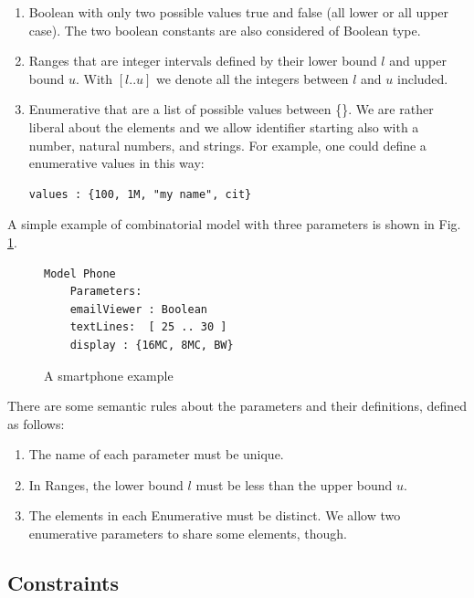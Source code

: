 \begin{tikzborder}{\cite{Gargantini16:validation}}
\begin{tikzborder}{\cite{gargantini_combinatorial_2017}}
\begin{tikzborder}{\cite{garn2019}}
\begin{tikzborder}{\cite{arcaini2019achieving}}
\begin{tikzborder}{\cite{IWCTGargantini2018}}
\begin{enumerate}
	\item \textsf{Boolean} with only two possible values \textsf{true} and \textsf{false} (all lower or all upper case).
	The two boolean constants are also considered of Boolean type.
	\item \textsf{Ranges} that are integer intervals defined by their lower bound $l$ and upper bound $u$. With $[l..u]$ we denote all the integers between $l$ and $u$ included.
	\item \textsf{Enumerative} that are a list of possible values between \{\}. We are rather liberal about the elements and we allow identifier starting also with a number, natural numbers, and strings. For example, one could define a  enumerative \textsf{values} in this way:
	\begin{lstlisting}[language=ctwedge]
	values : {100, 1M, "my name", cit}
	\end{lstlisting}
\end{enumerate}

A simple example of combinatorial model with three parameters is shown in Fig. \ref{fig:ctexample}. 
\end{tikzborder}

\begin{figure}[htb]
	\centering
	\begin{lstlisting}[language=ctwedge,frame= single]
	Model Phone
	Parameters:
	emailViewer : Boolean
	textLines:  [ 25 .. 30 ]
	display : {16MC, 8MC, BW}
	\end{lstlisting}
	\caption{A smartphone example}
	\label{fig:ctexample}
\end{figure}

\begin{tikzborder}{}
There are some semantic rules about the parameters and their definitions, defined as follows:
\begin{enumerate}
	\item The name of each parameter must be unique.
	\item In \textsf{Ranges}, the lower bound $l$ must be less than the upper bound $u$.
	\item The elements in each \textsf{Enumerative} must be distinct. We allow two enumerative parameters to share some elements, though.
\end{enumerate}
\end{tikzborder}

\subsection{Constraints}


\end{tikzborder}
\end{tikzborder}
\end{tikzborder}
\end{tikzborder}
